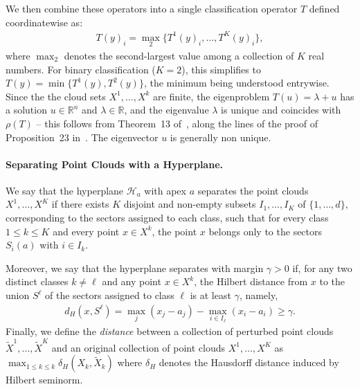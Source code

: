 \documentclass{article}
\renewcommand{\geq}{\geqslant}
\renewcommand{\leq}{\leqslant}
\newcommand{\R}{\mathbb{R}}
\begin{document}
We then combine these operators into a single classification operator $T$ defined coordinatewise as:
\begin{align}
  T(y)_i = \operatorname{\max}_2\{T^1(y)_i, \dots, T^K(y)_i\}\label{eq:single_operator},
\end{align}
where $\operatorname{\max}_2$ denotes the second-largest value among a collection of $K$ real numbers. For binary classification ($K=2$), this simplifies to $T(y)=\min\{T^1(y), T^2(y)\}$, the minimum being understood entrywise. Since the
the cloud sets $X^1,\dots,X^k$ are finite, the eigenproblem
$T(u) =\lambda + u$ has a solution $u\in \R^n$ and $\lambda\in \R$,
and the eigenvalue $\lambda$ is unique and coincides with $\rho(T)$ -- this follows
from Theorem~13 of~\cite{gaubert2004}, along the lines of the proof of Proposition~23
in~\cite{akiangaubertqisaadi}. The eigenvector $u$ is generally non unique.



\paragraph{Separating Point Clouds with a Hyperplane.}

We say that the hyperplane $\mathcal{H}_a$ with apex $a$ separates the point clouds $X^1, \ldots, X^K$ if there exists $K$ disjoint and non-empty subsets $I_1, \ldots, I_K$ of $\{1, \ldots, d\}$, corresponding to the sectors assigned to each class, such that for every class $1 \leq k \leq K$ and every point $x \in X^k$, the point $x$ belongs only to the sectors $S_i(a)$ with $i \in I_k$. 

Moreover, we say that the hyperplane separates with margin $\gamma > 0$ if, for any two distinct classes $k \neq \ell$ and any point $x \in X^k$, the Hilbert distance from $x$ to the union $S^\ell$ of the sectors assigned to class $\ell$ is at least $\gamma$, namely,
\begin{align}
d_H(x, S^\ell) = \max_j(x_j - a_j) - \max_{i \in I_\ell}(x_i - a_i) \geq \gamma.
\end{align}
Finally, we define the {\em distance} between a collection of perturbed point clouds $\tilde{X}^1,\dots, \tilde{X}^K$ and an original collection of point clouds $X^1,\dots,X^K$ as $\max_{1\leq k\leq k} \delta_H(X_k,\tilde{X}_k)$ where $\delta_H$ denotes the Hausdorff distance induced by Hilbert seminorm.
\end{document}
